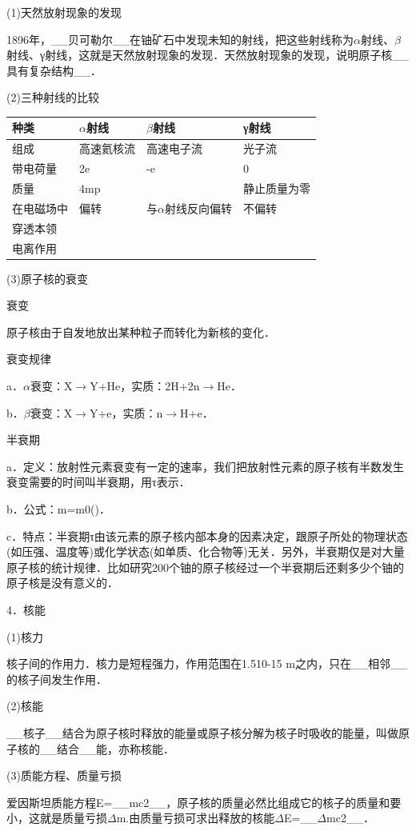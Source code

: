 (1)天然放射现象的发现

1896年，\_\_贝可勒尔\_\_在铀矿石中发现未知的射线，把这些射线称为$\alpha$射线、$\beta$射线、γ射线，这就是天然放射现象的发现．天然放射现象的发现，说明原子核\_\_具有复杂结构\_\_．

(2)三种射线的比较

\begin{longtable}[]{@{}m{2cm}m{2cm}m{3cm}m{2.5cm}@{}}
\toprule
种类 & $\alpha$射线 & $\beta$射线 & γ射线\tabularnewline
\midrule
\endhead
组成 & 高速氦核流 & 高速电子流 & 光子流\tabularnewline
带电荷量 & 2e & -e & 0\tabularnewline
质量 & 4mp & & 静止质量为零\tabularnewline
在电磁场中 & 偏转 & 与$\alpha$射线反向偏转 & 不偏转\tabularnewline
穿透本领 & & &\tabularnewline
电离作用 & & &\tabularnewline
\bottomrule
\end{longtable}

(3)原子核的衰变

衰变

原子核由于自发地放出某种粒子而转化为新核的变化．

衰变规律

a．$\alpha$衰变：X$\rightarrow$Y+He，实质：2H+2n$\rightarrow$He．

b．$\beta$衰变：X$\rightarrow$Y+e，实质：n$\rightarrow$H+e．

半衰期

a．定义：放射性元素衰变有一定的速率，我们把放射性元素的原子核有半数发生衰变需要的时间叫半衰期，用τ表示．

b．公式：m=m0()．

c．特点：半衰期τ由该元素的原子核内部本身的因素决定，跟原子所处的物理状态(如压强、温度等)或化学状态(如单质、化合物等)无关．另外，半衰期仅是对大量原子核的统计规律．比如研究200个铀的原子核经过一个半衰期后还剩多少个铀的原子核是没有意义的．

4．核能

(1)核力

核子间的作用力．核力是短程强力，作用范围在1.510-15
m之内，只在\_\_相邻\_\_的核子间发生作用．

(2)核能

\_\_核子\_\_结合为原子核时释放的能量或原子核分解为核子时吸收的能量，叫做原子核的\_\_结合\_\_能，亦称核能．

(3)质能方程、质量亏损

爱因斯坦质能方程E=\_\_mc2\_\_，原子核的质量必然比组成它的核子的质量和要小，这就是质量亏损$\Delta$m.由质量亏损可求出释放的核能$\Delta$E=\_\_$\Delta$mc2\_\_．

